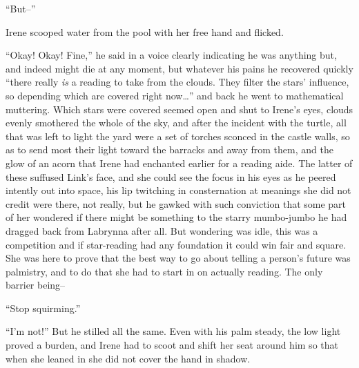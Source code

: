 \documentclass[../FGP.tex]{subfiles}
\begin{document}
\begin{fragment}
``But--'' 

Irene scooped water from the pool with her free hand and flicked. 

``Okay! Okay! Fine,'' he said in a voice clearly indicating he was anything but, and indeed might die at any moment, but whatever his pains he recovered quickly ``there really \emph{is} a reading to take from the clouds. They filter the stars' influence, so depending which are covered right now\ldots'' and back he went to mathematical muttering. Which stars were covered seemed open and shut to Irene's eyes, clouds evenly smothered the whole of the sky, and after the incident with the turtle, all that was left to light the yard were a set of torches sconced in the castle walls, so as to send most their light toward the barracks and away from them, and the glow of an acorn that Irene had enchanted earlier for a reading aide. The latter of these suffused Link's face, and she could see the focus in his eyes as he peered intently out into space, his lip twitching in consternation at meanings she did not credit were there, not really, but he gawked with such conviction that some part of her wondered if there might be something to the starry mumbo-jumbo he had dragged back from Labrynna after all. But wondering was idle, this was a competition and if star-reading had any foundation it could win fair and square. She was here to prove that the best way to go about telling a person's future was palmistry, and to do that she had to start in on actually reading. The only barrier being--
 
 ``Stop squirming.''

 ``I'm not!'' But he stilled all the same.\reversemarginpar{} Even with his palm steady, the low light proved a burden, and Irene had to scoot and shift her seat around him so that when she leaned in she did not cover the hand in shadow.


\end{fragment}
\end{document}
